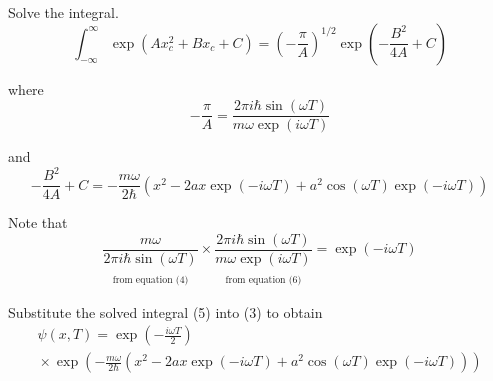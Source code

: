 \documentclass[12pt]{article}
\begin{document}
Solve the integral.
\begin{equation*}
\int_{-\infty}^\infty\exp(Ax_c^2+Bx_c+C)
=\left(-\frac{\pi}{A}\right)^{1/2}
\exp\left(-\frac{B^2}{4A}+C\right)
\tag{5}
\end{equation*}

where
\begin{equation*}
-\frac{\pi}{A}
=\frac{2\pi i\hbar\sin(\omega T)}{m\omega\exp(i\omega T)}
\tag{6}
\end{equation*}

and
\begin{equation*}
-\frac{B^2}{4A}+C
=-\frac{m\omega}{2\hbar}
\left(x^2-2ax\exp(-i\omega T)+a^2\cos(\omega T)\exp(-i\omega T)\right)
\tag{7}
\end{equation*}

Note that
\begin{equation*}
\underset{\substack{\\[1ex]\text{from equation (4)}}}
{\frac{m\omega}{2\pi i\hbar\sin(\omega T)}}
\times
\underset{\substack{\\[1ex]\text{from equation (6)}}}
{\frac{2\pi i\hbar\sin(\omega T)}{m\omega\exp(i\omega T)}}
=\exp(-i\omega T)
\tag{8}
\end{equation*}

Substitute the solved integral (5) into (3) to obtain
\begin{multline*}
\psi(x,T)=\exp\left(-\frac{i\omega T}{2}\right)
\\
{}\times
\exp\left(
-\frac{m\omega}{2\hbar}
\left(x^2-2ax\exp(-i\omega T)+a^2\cos(\omega T)\exp(-i\omega T)\right)
\right)
\end{multline*}

\end{document}
